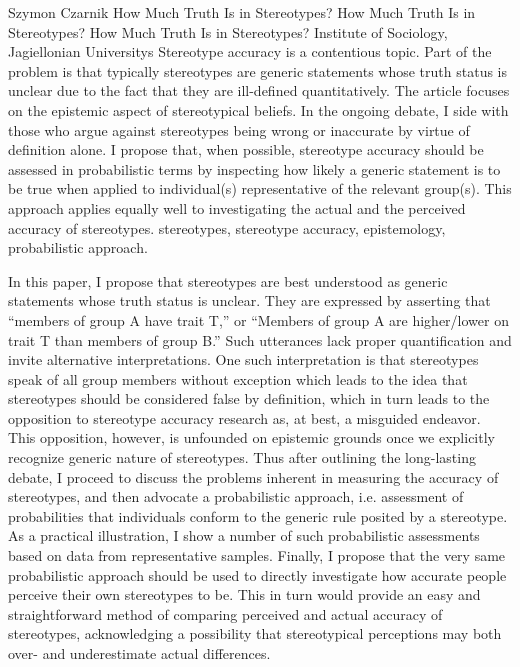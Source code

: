 \begin{artengenv}{Szymon Czarnik}
	{How Much Truth Is in Stereotypes?}
	{How Much Truth Is in Stereotypes?}
	{How Much Truth Is in Stereotypes?}
	{Institute of Sociology, Jagiellonian Universitys}
	{Stereotype accuracy is a contentious topic. Part of the problem is that typically stereotypes are generic statements whose truth status is unclear due to the fact that they are ill-defined quantitatively. The article focuses on the epistemic aspect of stereotypical beliefs. In the ongoing debate, I side with those who argue against stereotypes being wrong or inaccurate by virtue of definition alone. I propose that, when possible, stereotype accuracy should be assessed in probabilistic terms by inspecting how likely a generic statement is to be true when applied to individual(s) representative of the relevant group(s). This approach applies equally well to investigating the actual and the perceived accuracy of stereotypes.}
	{stereotypes, stereotype accuracy, epistemology, probabilistic approach.}

\vspace{2\baselineskip}
In this paper, I propose that stereotypes are best understood as generic statements whose truth status is unclear. They are expressed by asserting that ``members of group A have trait T,'' or ``Members of group A are higher/lower on trait T than members of group B.'' Such utterances lack proper quantification and invite alternative interpretations. One such interpretation is that stereotypes speak of all group members without exception which leads to the idea that stereotypes should be considered false by definition, which in turn leads to the opposition to stereotype accuracy research as, at best, a misguided endeavor. This opposition, however, is unfounded on epistemic grounds once we explicitly recognize generic nature of stereotypes. Thus after outlining the long-lasting debate, I proceed to discuss the problems inherent in measuring the accuracy of stereotypes, and then advocate a probabilistic approach, i.e. assessment of probabilities that individuals conform to the generic rule posited by a stereotype. As a practical illustration, I show a number of such probabilistic assessments based on data from representative samples. Finally, I propose that the very same probabilistic approach should be used to directly investigate how accurate people perceive their own stereotypes to be. This in turn would provide an easy and straightforward method of comparing perceived and actual accuracy of stereotypes, acknowledging a possibility that stereotypical perceptions may both over- and underestimate actual differences.



\end{artengenv}
